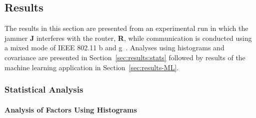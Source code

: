 \subsection{Results} \label{ftml-conf:sec:results}  

The results in this section are  presented from an experimental run in which the jammer \textbf{J} interferes with the router, \textbf{R}, while communication is conducted using a mixed mode of IEEE 802.11 b and g~\cite{IEEE802.11ac}.  Analyses using histograms and covariance are presented in Section~\ref{sec:results:stats} followed by results of the machine learning application in Section~\ref{sec:results-ML}.

\subsubsection{Statistical Analysis}\label{ftml-conf:sec:results:stats}
\paragraph{Analysis of Factors Using Histograms}



